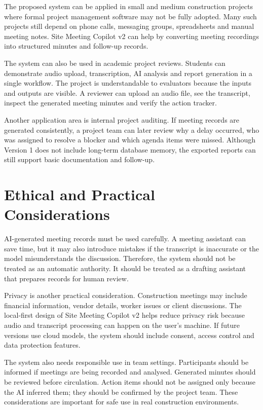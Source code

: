 \documentclass[11pt,a4paper]{article}
\begin{document}
The proposed system can be applied in small and medium construction projects where formal project management software may not be fully adopted. Many such projects still depend on phone calls, messaging groups, spreadsheets and manual meeting notes. Site Meeting Copilot v2 can help by converting meeting recordings into structured minutes and follow-up records.

The system can also be used in academic project reviews. Students can demonstrate audio upload, transcription, AI analysis and report generation in a single workflow. The project is understandable to evaluators because the inputs and outputs are visible. A reviewer can upload an audio file, see the transcript, inspect the generated meeting minutes and verify the action tracker.

Another application area is internal project auditing. If meeting records are generated consistently, a project team can later review why a delay occurred, who was assigned to resolve a blocker and which agenda items were missed. Although Version 1 does not include long-term database memory, the exported reports can still support basic documentation and follow-up.

\section{Ethical and Practical Considerations}

AI-generated meeting records must be used carefully. A meeting assistant can save time, but it may also introduce mistakes if the transcript is inaccurate or the model misunderstands the discussion. Therefore, the system should not be treated as an automatic authority. It should be treated as a drafting assistant that prepares records for human review.

Privacy is another practical consideration. Construction meetings may include financial information, vendor details, worker issues or client discussions. The local-first design of Site Meeting Copilot v2 helps reduce privacy risk because audio and transcript processing can happen on the user's machine. If future versions use cloud models, the system should include consent, access control and data protection features.

The system also needs responsible use in team settings. Participants should be informed if meetings are being recorded and analysed. Generated minutes should be reviewed before circulation. Action items should not be assigned only because the AI inferred them; they should be confirmed by the project team. These considerations are important for safe use in real construction environments.
\end{document}

